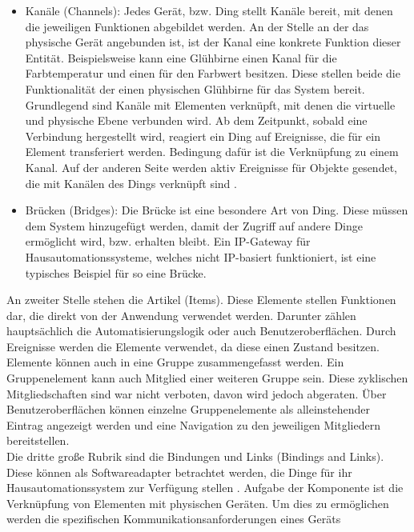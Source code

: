     \begin{itemize}
        \item Kanäle (Channels): Jedes Gerät, bzw. Ding stellt Kanäle bereit, mit denen die jeweiligen Funktionen abgebildet werden. 
        An der Stelle an der das physische Gerät angebunden ist, ist der Kanal eine konkrete Funktion dieser Entität. Beispielsweise 
        kann eine Glühbirne einen Kanal für die Farbtemperatur und einen für den Farbwert besitzen. Diese stellen beide die 
        Funktionalität der einen physischen Glühbirne für das System bereit. Grundlegend sind Kanäle mit Elementen verknüpft, mit denen 
        die virtuelle und physische Ebene verbunden wird. Ab dem Zeitpunkt, sobald eine Verbindung hergestellt wird, reagiert ein Ding 
        auf Ereignisse, die für ein Element transferiert werden. Bedingung dafür ist die Verknüpfung zu einem Kanal. Auf der anderen 
        Seite werden aktiv Ereignisse für Objekte gesendet, die mit Kanälen des Dings verknüpft sind \cite{openHAB-article}.
        \item Brücken (Bridges): Die Brücke ist eine besondere Art von Ding. Diese müssen dem System hinzugefügt werden, damit der 
        Zugriff auf andere Dinge ermöglicht wird, bzw. erhalten bleibt. Ein IP-Gateway für Hausautomationssysteme, welches nicht 
        IP-basiert funktioniert, ist eine typisches Beispiel für so eine Brücke.
    \end{itemize}
    An zweiter Stelle stehen die Artikel (Items). Diese Elemente stellen Funktionen dar, die direkt von der Anwendung verwendet 
    werden. Darunter zählen hauptsächlich die Automatisierungslogik oder auch Benutzeroberflächen. Durch Ereignisse werden die 
    Elemente verwendet, da diese einen Zustand besitzen. 
    \\
    Elemente können auch in eine Gruppe zusammengefasst werden. Ein Gruppenelement kann auch Mitglied einer weiteren Gruppe sein. 
    Diese zyklischen Mitgliedschaften sind war nicht verboten, davon wird jedoch abgeraten. Über Benutzeroberflächen können 
    einzelne Gruppenelemente als alleinstehender Eintrag angezeigt werden und eine Navigation zu den jeweiligen Mitgliedern 
    bereitstellen. 
    \\
    \linebreak
    Die dritte große Rubrik sind die Bindungen und Links (Bindings and Links). Diese können als Softwareadapter betrachtet werden, 
    die Dinge für ihr Hausautomationssystem zur Verfügung stellen \cite{openHAB-article}. Aufgabe der Komponente ist die Verknüpfung 
    von Elementen mit physischen Geräten. Um dies zu ermöglichen werden die spezifischen Kommunikationsanforderungen eines Geräts 
